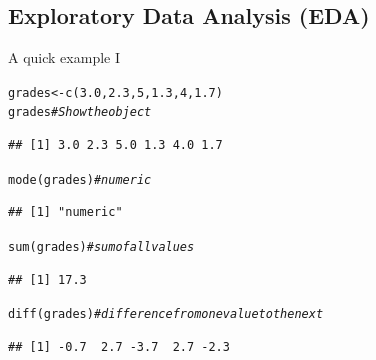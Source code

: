 \documentclass[xcolor=table,           xcolor=dvipsnames]{beamer}\usepackage[]{graphicx}\usepackage[]{color}
\makeatletter
\newcommand{\hlnum}[1]{\textcolor[rgb]{0,0,0}{#1}}
\newcommand{\hlcom}[1]{\textcolor[rgb]{0,0.392,0}{\textit{#1}}}
\newcommand{\hlstd}[1]{\textcolor[rgb]{0,0,0}{#1}}
\newcommand{\hlkwb}[1]{\textcolor[rgb]{0,0,0}{#1}}
\newcommand{\hlkwd}[1]{\textcolor[rgb]{0,0,1}{#1}}
\newenvironment{kframe}{%
 \def\at@end@of@kframe{}%
 \ifinner\ifhmode%
  \def\at@end@of@kframe{\end{minipage}}%
  \begin{minipage}{\columnwidth}%
 \fi\fi%
 \def\FrameCommand##1{\hskip\@totalleftmargin \hskip-\fboxsep
 \colorbox{shadecolor}{##1}\hskip-\fboxsep
     \hskip-\linewidth \hskip-\@totalleftmargin \hskip\columnwidth}%
 \MakeFramed {\advance\hsize-\width
   \@totalleftmargin\z@ \linewidth\hsize
   \@setminipage}}%
 {\par\unskip\endMakeFramed%
 \at@end@of@kframe}
\newenvironment{knitrout}{}{} %
\makeatother
\begin{document}
\subsection{Exploratory Data Analysis (EDA)}

\begin{frame}[fragile]{A quick example I}
\begin{knitrout}
\color{fgcolor}\begin{kframe}
\begin{alltt}
\hlstd{grades} \hlkwb{<-} \hlkwd{c}\hlstd{(}\hlnum{3.0}\hlstd{,} \hlnum{2.3}\hlstd{,} \hlnum{5}\hlstd{,} \hlnum{1.3}\hlstd{,} \hlnum{4}\hlstd{,} \hlnum{1.7}\hlstd{)}
\hlstd{grades}         \hlcom{# Show the object}
\end{alltt}
\begin{verbatim}
## [1] 3.0 2.3 5.0 1.3 4.0 1.7
\end{verbatim}
\begin{alltt}
\hlkwd{mode}\hlstd{(grades)}   \hlcom{# numeric}
\end{alltt}
\begin{verbatim}
## [1] "numeric"
\end{verbatim}
\begin{alltt}
\hlkwd{sum}\hlstd{(grades)}    \hlcom{# sum of all values}
\end{alltt}
\begin{verbatim}
## [1] 17.3
\end{verbatim}
\begin{alltt}
\hlkwd{diff}\hlstd{(grades)}   \hlcom{# difference from one value to the next}
\end{alltt}
\begin{verbatim}
## [1] -0.7  2.7 -3.7  2.7 -2.3
\end{verbatim}
\end{kframe}
\end{knitrout}
\end{frame}

\end{document}
